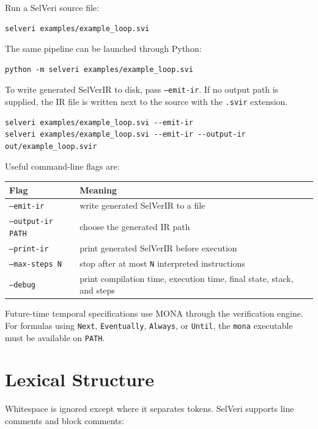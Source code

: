 \documentclass[11pt]{article}
\begin{document}
Run a SelVeri source file:

\begin{lstlisting}
selveri examples/example_loop.svi
\end{lstlisting}

The same pipeline can be launched through Python:

\begin{lstlisting}
python -m selveri examples/example_loop.svi
\end{lstlisting}

To write generated SelVerIR to disk, pass \texttt{--emit-ir}. If no output path is supplied, the IR file is written next to the source with the \texttt{.svir} extension.

\begin{lstlisting}
selveri examples/example_loop.svi --emit-ir
selveri examples/example_loop.svi --emit-ir --output-ir out/example_loop.svir
\end{lstlisting}

Useful command-line flags are:

\begin{center}
\begin{tabular}{ll}
\toprule
Flag & Meaning \\
\midrule
\texttt{--emit-ir} & write generated SelVerIR to a file \\
\texttt{--output-ir PATH} & choose the generated IR path \\
\texttt{--print-ir} & print generated SelVerIR before execution \\
\texttt{--max-steps N} & stop after at most \texttt{N} interpreted instructions \\
\texttt{--debug} & print compilation time, execution time, final state, stack, and steps \\
\bottomrule
\end{tabular}
\end{center}

Future-time temporal specifications use MONA through the verification engine. For formulas using \texttt{Next}, \texttt{Eventually}, \texttt{Always}, or \texttt{Until}, the \texttt{mona} executable must be available on \texttt{PATH}.

\section{Lexical Structure}

Whitespace is ignored except where it separates tokens. SelVeri supports line comments and block comments:
\end{document}
